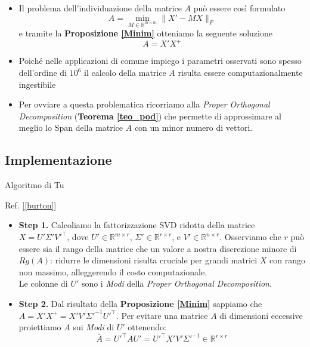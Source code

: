 \documentclass[serif]{beamer}
\newcommand{\R}{\mathbb{R}}
\begin{document}
\begin{frame}
\begin{itemize}
    \item Il problema dell'individuazione della matrice \(A\) può essere così formulato
    \[A= \min_{M \in \R^{m \times m}}{\|X' -MX\|_F } \]
     e tramite la  \textbf{Proposizione \ref{Minim}} otteniamo la seguente soluzione
    \[ A= X' X^+ \]
\end{itemize}
\end{frame}

\begin{frame}
\begin{itemize}
\item Poiché nelle applicazioni di comune impiego i parametri osservati sono spesso dell'ordine di \( 10^6\) il calcolo della matrice \(A\) risulta essere computazionalmente ingestibile
\item Per ovviare a questa problematica ricorriamo alla\textit{ Proper Orthogonal Decomposition} (\textbf{Teorema \ref{teo_pod}}) che permette di approssimare al meglio lo Span della matrice \(A\) con un minor numero di vettori.
\end{itemize}
\end{frame}

\subsection{Implementazione}
\begin{frame}{Algoritmo di Tu  \begin{small} Ref. [\ref{burton}] \end{small}}
\begin{itemize}
    \item \textbf{Step 1.} Calcoliamo la fattorizzazione SVD ridotta della matrice \(X = U' \Sigma' V'^\top\), dove \(U' \in \R^{m \times r}\), \(\Sigma' \in \R^{r \times r}\), e \(V' \in \R^{n \times r}\). Osserviamo che \(r\) può essere sia il rango della matrice che un valore a nostra discrezione minore di \(Rg(A)\): ridurre le dimensioni risulta cruciale per grandi matrici $X$ con rango non massimo, alleggerendo il costo computazionale. \\Le colonne di $U'$ sono i \textit{Modi} della \textit{Proper Orthogonal Decomposition}.

    \item \textbf{Step 2.} Dal risultato della \textbf{Proposizione \ref{Minim}} sappiamo che \(A = X' X^+ = X' V' \Sigma'^{-1} U'^\top\). Per evitare una matrice \(A\) di dimensioni eccessive proiettiamo \(A\) sui \textit{Modi} di $U'$ ottenendo:
    \[
    \bar{A} = U'^\top A U' = U'^\top X' V' \Sigma'^{-1} \in \R^{r \times r}
    \]

\end{itemize}
\end{frame}
\end{document}
